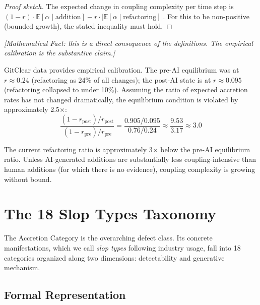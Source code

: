 \documentclass[11pt, a4paper, copyright]{googledeepmind}
\newcommand{\E}{\mathbb{E}}
\begin{document}
\begin{proof}[Proof sketch]
The expected change in coupling complexity per time step is $(1-r) \cdot \E[\alpha \mid \text{addition}] - r \cdot |\E[\alpha \mid \text{refactoring}]|$. For this to be non-positive (bounded growth), the stated inequality must hold.
\end{proof}

\emph{[Mathematical Fact: this is a direct consequence of the definitions. The empirical calibration is the substantive claim.]}

GitClear data provides empirical calibration. The pre-AI equilibrium was at $r \approx 0.24$ (refactoring as 24\% of all changes); the post-AI state is at $r \approx 0.095$ (refactoring collapsed to under 10\%). Assuming the ratio of expected accretion rates has not changed dramatically, the equilibrium condition is violated by approximately 2.5$\times$:
\begin{equation}
\frac{(1-r_{\text{post}}) / r_{\text{post}}}{(1-r_{\text{pre}}) / r_{\text{pre}}} = \frac{0.905 / 0.095}{0.76 / 0.24} \approx \frac{9.53}{3.17} \approx 3.0
\end{equation}

The current refactoring ratio is approximately 3$\times$ below the pre-AI equilibrium ratio. Unless AI-generated additions are substantially less coupling-intensive than human additions (for which there is no evidence), coupling complexity is growing without bound.


\section{The 18 Slop Types Taxonomy}
\label{sec:taxonomy}

The Accretion Category is the overarching defect class. Its concrete manifestations, which we call \emph{slop types} following industry usage, fall into 18 categories organized along two dimensions: detectability and generative mechanism.

\subsection{Formal Representation}
\end{document}
